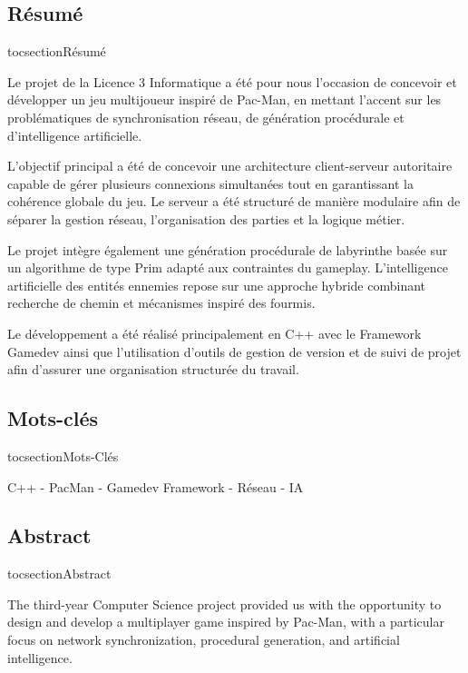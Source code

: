 \documentclass[a4paper, 11pt]{article}
\begin{document}
\newpage
\begin{center}
    \vspace*{\fill} %
    \subsection*{Résumé}
    \addcontentsline
    {toc}{section}{Résumé}
    \begin{justify}

        Le projet de la Licence 3 Informatique a été pour nous l’occasion de concevoir et développer un jeu multijoueur inspiré de Pac-Man, en mettant l’accent sur les problématiques de synchronisation réseau, de génération procédurale et d’intelligence artificielle.

        L’objectif principal a été de concevoir une architecture client-serveur autoritaire capable de gérer plusieurs connexions simultanées tout en garantissant la cohérence globale du jeu. Le serveur a été structuré de manière modulaire afin de séparer la gestion réseau, l’organisation des parties et la logique métier.

        Le projet intègre également une génération procédurale de labyrinthe basée sur un algorithme de type Prim adapté aux contraintes du gameplay. L’intelligence artificielle des entités ennemies repose sur une approche hybride combinant recherche de chemin et mécanismes inspiré des fourmis.

        Le développement a été réalisé principalement en C++ avec le Framework Gamedev ainsi que l’utilisation d’outils de gestion de version et de suivi de projet afin d’assurer une organisation structurée du travail.

    \end{justify}
    \vspace*{\fill} %

    \subsection*{Mots-clés}
    \addcontentsline
    {toc}{section}{Mots-Clés}
    \begin{center}
     C++ - PacMan - Gamedev Framework - Réseau - IA
    \end{center}
    \vspace*{\fill} %

    \subsection*{Abstract}
    \addcontentsline
    {toc}{section}{Abstract}
    \begin{justify}
The third-year Computer Science project provided us with the opportunity to design and develop a multiplayer game inspired by Pac-Man, with a particular focus on network synchronization, procedural generation, and artificial intelligence.


\end{justify}
\end{center}
\end{document}
